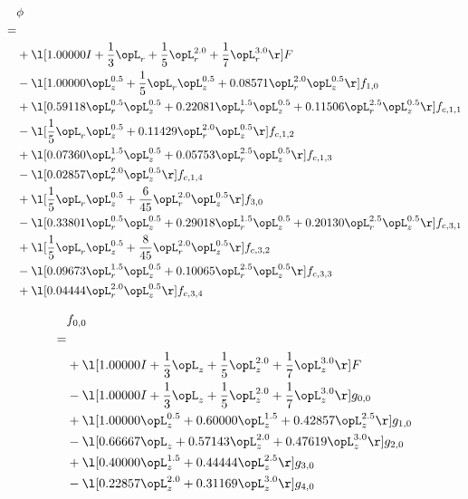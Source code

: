 \begin{alignat}{2} 
\label{eq:scalarFlux_0} 
& \phi \nonumber \\ 
 = \\ 
& + \l[  1.00000 I + \frac{1}{3} \opL_r + \frac{1}{5} \opL_r^{2.0} + \frac{1}{7} \opL_r^{3.0}  \r] F \nonumber \\ 
& - \l[  1.00000 \opL_z^{0.5} + \frac{1}{5} \opL_r \opL_z^{0.5} +  0.08571 \opL_r^{2.0} \opL_z^{0.5}  \r] f_{1,0} \nonumber \\ 
& + \l[  0.59118 \opL_r^{0.5} \opL_z^{0.5} +  0.22081 \opL_r^{1.5} \opL_z^{0.5} +  0.11506 \opL_r^{2.5} \opL_z^{0.5}  \r] f_{c,1,1} \nonumber \\ 
& - \l[ \frac{1}{5} \opL_r \opL_z^{0.5} +  0.11429 \opL_r^{2.0} \opL_z^{0.5}  \r] f_{c,1,2} \nonumber \\ 
& + \l[  0.07360 \opL_r^{1.5} \opL_z^{0.5} +  0.05753 \opL_r^{2.5} \opL_z^{0.5}  \r] f_{c,1,3} \nonumber \\ 
& - \l[  0.02857 \opL_r^{2.0} \opL_z^{0.5}  \r] f_{c,1,4} \nonumber \\ 
& + \l[ \frac{1}{5} \opL_r \opL_z^{0.5} + \frac{6}{45} \opL_r^{2.0} \opL_z^{0.5}  \r] f_{3,0} \nonumber \\ 
& - \l[  0.33801 \opL_r^{0.5} \opL_z^{0.5} +  0.29018 \opL_r^{1.5} \opL_z^{0.5} +  0.20130 \opL_r^{2.5} \opL_z^{0.5}  \r] f_{c,3,1} \nonumber \\ 
& + \l[ \frac{1}{5} \opL_r \opL_z^{0.5} + \frac{8}{45} \opL_r^{2.0} \opL_z^{0.5}  \r] f_{c,3,2} \nonumber \\ 
& - \l[  0.09673 \opL_r^{1.5} \opL_z^{0.5} +  0.10065 \opL_r^{2.5} \opL_z^{0.5}  \r] f_{c,3,3} \nonumber \\ 
& + \l[  0.04444 \opL_r^{2.0} \opL_z^{0.5}  \r] f_{c,3,4} \nonumber \\ 
\end{alignat} 


\begin{alignat}{2} 
\label{eq:f_00_0} 
& f_{0,0} \nonumber \\ 
 = \\ 
& + \l[  1.00000 I + \frac{1}{3} \opL_z + \frac{1}{5} \opL_z^{2.0} + \frac{1}{7} \opL_z^{3.0}  \r] F \nonumber \\ 
& - \l[  1.00000 I + \frac{1}{3} \opL_z + \frac{1}{5} \opL_z^{2.0} + \frac{1}{7} \opL_z^{3.0}  \r] g_{0,0} \nonumber \\ 
& + \l[  1.00000 \opL_z^{0.5} +  0.60000 \opL_z^{1.5} +  0.42857 \opL_z^{2.5}  \r] g_{1,0} \nonumber \\ 
& - \l[  0.66667 \opL_z +  0.57143 \opL_z^{2.0} +  0.47619 \opL_z^{3.0}  \r] g_{2,0} \nonumber \\ 
& + \l[  0.40000 \opL_z^{1.5} +  0.44444 \opL_z^{2.5}  \r] g_{3,0} \nonumber \\ 
& - \l[  0.22857 \opL_z^{2.0} +  0.31169 \opL_z^{3.0}  \r] g_{4,0} \nonumber \\ 
\end{alignat} 


